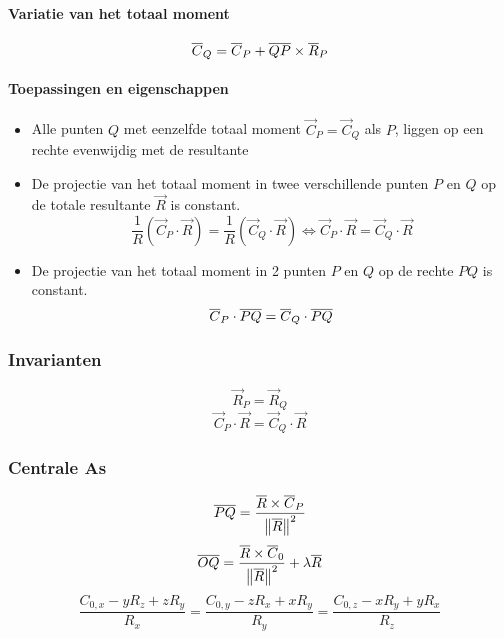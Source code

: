   \paragraph{Variatie van het totaal moment}
  \label{sec:VariatietotaalMoment}
    \[
      \overline{C}_Q = \overline{C}_P + \overline{QP} \times \overline{R}_P
    \]
  \paragraph{Toepassingen en eigenschappen}
  \label{sec:eigToepVarTotaalMoment}
    \begin{itemize}
	    \item Alle punten $Q$ met eenzelfde totaal moment $\vec{C}_P = \vec{C}_Q$ als $P$, liggen op een rechte evenwijdig met de resultante
	    \item De projectie van het totaal moment in twee verschillende punten $P$ en $Q$ op de totale resultante $\vec{R}$ is constant.
	          \[
	            \frac{1}{R} \left( \vec{C}_P \cdot \vec{R} \right) = \frac{1}{R} \left( \vec{C}_Q \cdot \vec{R} \right)
	            \Leftrightarrow
	            \vec{C}_P \cdot \vec{R} = \vec{C}_Q \cdot \vec{R}
	          \]
	    \item De projectie van het totaal moment in 2 punten $P$ en $Q$ op de rechte $PQ$ is constant.
	          \[
	            \overline{C}_P \cdot \overline{PQ} = \overline{C}_Q \cdot \overline{PQ}
	          \]
	    
    \end{itemize}
  
  \subsubsection{Invarianten}
  \label{sec:Invarianten}
    \[
      \vec{R}_P = \vec{R}_Q
    \]
    \[
      \vec{C}_P \cdot \vec{R} = \vec{C}_Q \cdot \vec{R}
    \]
   
   \subsubsection{Centrale As}
   \label{sec:CentraleAs}   
   \[
     \overline{PQ} = \frac{\overline{R} \times \overline{C}_P}{\left\| \overline{R} \right\|^2}
   \]
   \[
     \overline{OQ} = \frac{\overline{R} \times \overline{C}_0}{\left\| \overline{R} \right\|^2} + \lambda \overline{R}
   \]
   \[
     \frac{C_{0,x} - yR_z + zR_y}{R_x} = \frac{C_{0,y} - zR_x + xR_y}{R_y} = \frac{C_{0,z} - xR_y + yR_x}{R_z}
   \]
